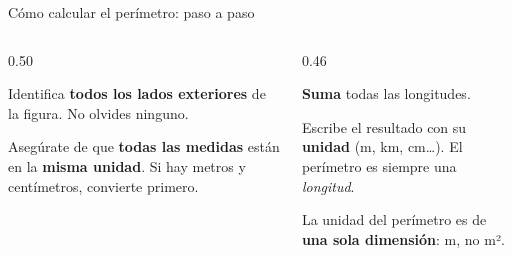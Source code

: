 \documentclass[aspectratio=169, 10pt, spanish]{beamer}
\begin{document}
\begin{frame}{Cómo calcular el perímetro: paso a paso}
  \begin{columns}[t]
    \begin{column}{0.50\textwidth}
      \begin{pasobox}[1]
        Identifica \textbf{todos los lados exteriores}
        de la figura. No olvides ninguno.
      \end{pasobox}
      \vspace{0.3cm}
      \begin{pasobox}[2]
        Asegúrate de que \textbf{todas las medidas}
        están en la \textbf{misma unidad}.
        Si hay metros y centímetros, convierte primero.
      \end{pasobox}
    \end{column}
    \begin{column}{0.46\textwidth}
      \begin{pasobox}[3]
        \textbf{Suma} todas las longitudes.
      \end{pasobox}
      \vspace{0.3cm}
      \begin{pasobox}[4]
        Escribe el resultado con su \textbf{unidad}
        (m, km, cm…).
        El perímetro es siempre una \emph{longitud}.
      \end{pasobox}
      \vspace{0.3cm}
      \begin{notabox}
        \AlmFontSmall La unidad del perímetro es de
        \textbf{una sola dimensión}: m, no m².
      \end{notabox}
    \end{column}
  \end{columns}
\end{frame}

\end{document}
